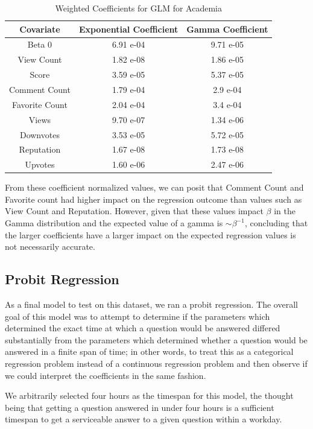 \documentclass[12pt]{article}
\begin{document}
\begin{table}[ht]
  \centering
  \begin{tabular}{|c|c|c|}\hline
    Covariate & Exponential Coefficient & Gamma Coefficient \\ \hline
    Beta 0 & 6.91 e-04 & 9.71 e-05\\
    View Count & 1.82 e-08 & 1.86 e-05\\
    Score & 3.59 e-05 & 5.37 e-05\\
    Comment Count & 1.79 e-04 & 2.9 e-04\\
    Favorite Count & 2.04 e-04 & 3.4 e-04\\
    Views & 9.70 e-07 & 1.34 e-06\\
    Downvotes & 3.53 e-05 & 5.72 e-05\\
    Reputation & 1.67 e-08 & 1.73 e-08\\
    Upvotes & 1.60 e-06 & 2.47 e-06\\ \hline
  \end{tabular}
  \caption{Weighted Coefficients for GLM for Academia}
  \label{normal_coeffs}
\end{table}

From these coefficient normalized values, we can posit that Comment Count and Favorite count had higher impact on the regression outcome than values such as View Count and Reputation. However, given that these values impact $\beta$ in the Gamma distribution and the expected value of a gamma is $\sim \beta^{-1}$, concluding that the larger coefficients have a larger impact on the expected regression values is not necessarily accurate. 

\subsection{Probit Regression}
As a final model to test on this dataset, we ran a probit regression. The overall goal of this model was to attempt to determine if the parameters which determined the exact time at which a question would be answered differed substantially from the parameters which determined whether a question would be answered in a finite span of time; in other words, to treat this as a categorical regression problem instead of a continuous regression problem and then observe if we could interpret the coefficients in the same fashion. 

We arbitrarily selected four hours as the timespan for this model, the thought being that getting a question answered in under four hours is a sufficient timespan to get a serviceable answer to a given question within a workday. 
\end{document}
